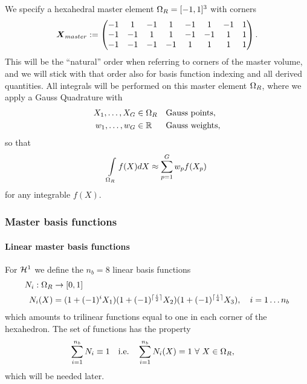 We specify a hexahedral master element $\Omega_R = [-1,1]^3$ with corners
\begin{align*}
	\boldsymbol{X}_{master} := \left(\begin{matrix}-1 & 1 & -1 & 1 & -1 & 1 & -1 &1\\-1 & -1 & 1 & 1 & -1 & -1 & 1 &1\\-1 & -1 & -1 & -1 & 1 & 1 & 1 &1\\\end{matrix}\right).
\end{align*}
This will be the ``natural'' order when referring to corners of the master volume, and we will stick with that order also for basis function indexing and all derived quantities.
All integrals will be performed on this master element $\Omega_R$, where we apply a Gauss Quadrature with
\begin{align}
	X_1,\ldots,X_G  &\in \Omega_R &&\text{Gauss points},\\
	w_1,\ldots,w_G  &\in \mathbb{R} &&\text{Gauss weights},
\end{align}
so that
\begin{align}
	\int\limits_{\Omega_R}^{} f(X)dX \approx \sum\limits_{p=1}^{G} w_pf(X_p)\label{def:gaussintapprox}
\end{align}
for any integrable $f(X)$.
\subsubsection{Master basis functions}
\paragraph{Linear master basis functions}
For $\mathcal{H}^1$ we define the $n_b=8$ linear basis functions
\begin{align*}
	N_i:\Omega_R &\to [0,1]\\
	N_i(X)  &= (1+(-1)^{i}X_1)(1+(-1)^{\lceil\frac{i}{2}\rceil}X_2)(1+(-1)^{\lceil\frac{i}{4}\rceil}X_3),\quad i=1\ldots n_b
\end{align*}
which amounts to trilinear functions equal to one in each corner of the hexahedron.
The set of functions has the property
\begin{align}
	\sum\limits_{i=1}^{n_b}N_i &\equiv 1 & \text{i.e.}\quad \sum\limits_{i=1}^{n_b}N_i(X) &= 1 ~\forall~ X\in\Omega_R,\label{eq:basisfunsum}
\end{align}
which will be needed later.
